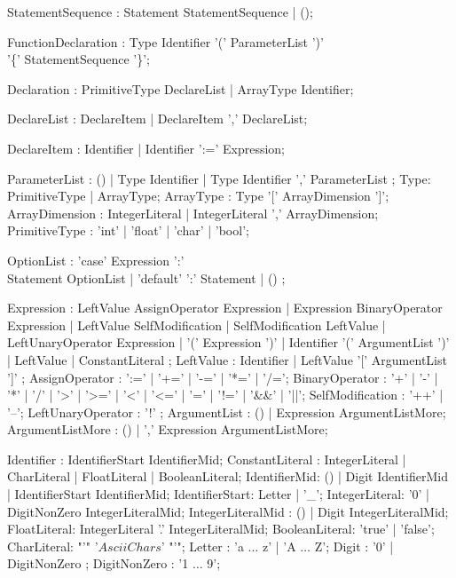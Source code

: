 \documentclass[a4paper, 11.5pt]{article}
\begin{document}
    \begin{multicols}{2}

    \begin{rail}
      StatementSequence : Statement StatementSequence | ();

      FunctionDeclaration : Type Identifier '(' ParameterList ')' \\
                          '\{' StatementSequence '\}';
      
      Declaration : PrimitiveType DeclareList | ArrayType Identifier;

      DeclareList : DeclareItem | DeclareItem ',' DeclareList;

      DeclareItem : Identifier | Identifier ':=' Expression;

      ParameterList : () | Type Identifier | Type Identifier ',' ParameterList ;
      Type: PrimitiveType | ArrayType;
      ArrayType : Type '[' ArrayDimension ']';
      ArrayDimension : IntegerLiteral | IntegerLiteral ',' ArrayDimension;
      PrimitiveType : 'int' | 'float' | 'char' | 'bool';

      OptionList : 'case' Expression ':' \\
                    Statement OptionList
                | 'default' ':' Statement
                | ()
                ;
    \end{rail}
    
  
    \begin{rail}      
      Expression : LeftValue AssignOperator Expression
                  | Expression BinaryOperator Expression
                  | LeftValue SelfModification
                  | SelfModification LeftValue
                  | LeftUnaryOperator Expression
                  | '(' Expression ')'
                  | Identifier '(' ArgumentList ')'
                  | LeftValue
                  | ConstantLiteral
                  ;
      LeftValue : Identifier
                | LeftValue '[' ArgumentList ']'
                ;
      AssignOperator : ':=' | '+=' | '-=' | '*=' | '/=';
      BinaryOperator : '+' | '-' | '*' | '/' 
                      | '>' | '>=' | '<' | '<=' | '=' | '!=' 
                      | '\&\&' | '||';
      SelfModification : '++' | '--';
      LeftUnaryOperator : '!' ;
      ArgumentList : () | Expression ArgumentListMore;
      ArgumentListMore : () | ',' Expression ArgumentListMore;

    \end{rail}

    \begin{rail}
      Identifier : IdentifierStart IdentifierMid;
      ConstantLiteral : IntegerLiteral | CharLiteral | FloatLiteral | BooleanLiteral;
      IdentifierMid: () | Digit IdentifierMid | IdentifierStart IdentifierMid;
      IdentifierStart: Letter | '\_';
      IntegerLiteral: '0' | DigitNonZero IntegerLiteralMid;
      IntegerLiteralMid : () | Digit IntegerLiteralMid;
      FloatLiteral: IntegerLiteral '.' IntegerLiteralMid;
      BooleanLiteral: 'true' | 'false';
      CharLiteral: "'" '$Ascii Chars$' "'";
      Letter : 'a $\ldots$ z' | 'A $\ldots$ Z';
      Digit : '0' | DigitNonZero ;
      DigitNonZero : '1 $\ldots$ 9';
    \end{rail}


\end{multicols}
\end{document}
